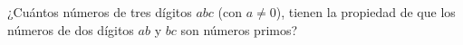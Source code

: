 ¿Cuántos números de tres dígitos $abc$ (con $a \neq 0$), tienen la propiedad de que los números de dos dígitos $ab$ y $bc$ son números primos?